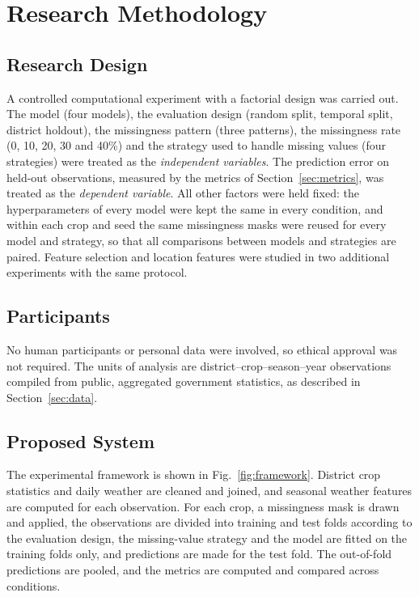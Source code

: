 \section{Research Methodology}\label{sec:method}

\subsection{Research Design}

A controlled computational experiment with a factorial design was carried out. The model (four
models), the evaluation design (random split, temporal split, district holdout), the missingness
pattern (three patterns), the missingness rate (0, 10, 20, 30 and 40\%) and the strategy used to
handle missing values (four strategies) were treated as the \emph{independent variables}. The
prediction error on held-out observations, measured by the metrics of Section~\ref{sec:metrics},
was treated as the \emph{dependent variable}. All other factors were held fixed: the
hyperparameters of every model were kept the same in every condition, and within each crop and
seed the same missingness masks were reused for every model and strategy, so that all comparisons
between models and strategies are paired. Feature selection and location features were studied in
two additional experiments with the same protocol.

\subsection{Participants}

No human participants or personal data were involved, so ethical approval was not required. The
units of analysis are district--crop--season--year observations compiled from public, aggregated
government statistics, as described in Section~\ref{sec:data}.

\subsection{Proposed System}

The experimental framework is shown in Fig.~\ref{fig:framework}. District crop statistics and daily
weather are cleaned and joined, and seasonal weather features are computed for each observation.
For each crop, a missingness mask is drawn and applied, the observations are divided into training
and test folds according to the evaluation design, the missing-value strategy and the model are
fitted on the training folds only, and predictions are made for the test fold. The out-of-fold
predictions are pooled, and the metrics are computed and compared across conditions.

